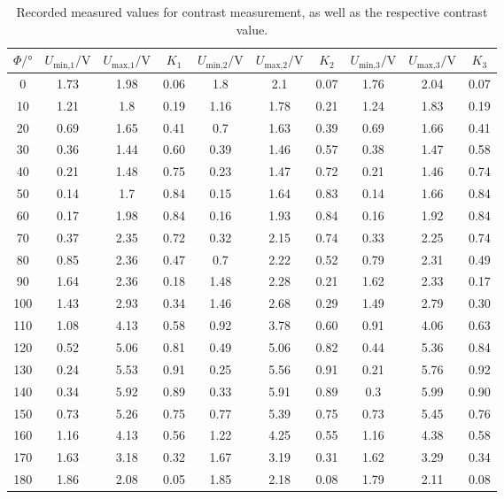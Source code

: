 \begin{table}[H]
  \centering
  \caption{Recorded measured values for contrast measurement, as well as the respective contrast value.}
  \label{tab:Kontrast}
  \begin{tabular}{c c c c c c c c c c}
    \toprule
    $\Phi / \si{\degree} $ & $U_{\text{min,1}} / \si{\volt}$ & $U_{\text{max,1}} / \si{\volt}$ & $K_1$ & $U_{\text{min,2}} / \si{\volt}$ & $U_{\text{max,2}} / \si{\volt}$ & $K_2$ &  $U_{\text{min,3}} / \si{\volt}$ & $U_{\text{max,3}} / \si{\volt}$ & $K_3$ \\
    \midrule
    0  & 1.73 & 1.98 & 0.06 & 1.8  & 2.1  & 0.07 &  1.76 &  2.04 & 0.07 \\
    10 & 1.21 & 1.8  & 0.19 & 1.16 & 1.78 & 0.21 &  1.24 &  1.83 & 0.19 \\
    20 & 0.69 & 1.65 & 0.41 & 0.7  & 1.63 & 0.39 &  0.69 &  1.66 & 0.41 \\
    30 & 0.36 & 1.44 & 0.60 & 0.39 & 1.46 & 0.57 &  0.38 &  1.47 & 0.58 \\
    40 & 0.21 & 1.48 & 0.75 & 0.23 & 1.47 & 0.72 &  0.21 &  1.46 & 0.74 \\
    50 & 0.14 & 1.7  & 0.84 & 0.15 & 1.64 & 0.83 &  0.14 &  1.66 & 0.84 \\
    60 & 0.17 & 1.98 & 0.84 & 0.16 & 1.93 & 0.84 &  0.16 &  1.92 & 0.84 \\
    70 & 0.37 & 2.35 & 0.72 & 0.32 & 2.15 & 0.74 &  0.33 &  2.25 & 0.74 \\
    80 & 0.85 & 2.36 & 0.47 & 0.7  & 2.22 & 0.52 &  0.79 &  2.31 & 0.49 \\
    90 & 1.64 & 2.36 & 0.18 & 1.48 & 2.28 & 0.21 &  1.62 &  2.33 & 0.17 \\
    100& 1.43 & 2.93 & 0.34 & 1.46 & 2.68 & 0.29 &  1.49 &  2.79 & 0.30 \\
    110& 1.08 & 4.13 & 0.58 & 0.92 & 3.78 & 0.60 &  0.91 &  4.06 & 0.63 \\
    120& 0.52 & 5.06 & 0.81 & 0.49 & 5.06 & 0.82 &  0.44 &  5.36 & 0.84 \\
    130& 0.24 & 5.53 & 0.91 & 0.25 & 5.56 & 0.91 &  0.21 &  5.76 & 0.92 \\
    140& 0.34 & 5.92 & 0.89 & 0.33 & 5.91 & 0.89 &  0.3  &  5.99 & 0.90 \\
    150& 0.73 & 5.26 & 0.75 & 0.77 & 5.39 & 0.75 &  0.73 &  5.45 & 0.76 \\
    160& 1.16 & 4.13 & 0.56 & 1.22 & 4.25 & 0.55 &  1.16 &  4.38 & 0.58 \\
    170& 1.63 & 3.18 & 0.32 & 1.67 & 3.19 & 0.31 &  1.62 &  3.29 & 0.34 \\
    180& 1.86 & 2.08 & 0.05 & 1.85 & 2.18 & 0.08 &  1.79 &  2.11 & 0.08 \\
    \bottomrule
  \end{tabular}
\end{table}


